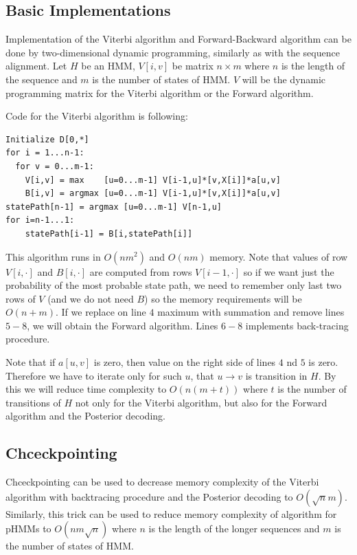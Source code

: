 \subsection{Basic Implementations}

Implementation of the Viterbi algorithm and Forward-Backward algorithm can be
done by two-dimensional dynamic programming, similarly as with the sequence
alignment. Let $H$ be an HMM, $V[i,v]$ be matrix $n\times m$ where $n$ is the
length of the sequence and $m$ is the number of states of HMM. $V$ will be the
dynamic programming matrix for the Viterbi algorithm or the Forward algorithm.

Code for the Viterbi algorithm is following:
\begin{lstlisting}
Initialize D[0,*]
for i = 1...n-1:
  for v = 0...m-1:
    V[i,v] = max    [u=0...m-1] V[i-1,u]*[v,X[i]]*a[u,v]
    B[i,v] = argmax [u=0...m-1] V[i-1,u]*[v,X[i]]*a[u,v]
statePath[n-1] = argmax [u=0...m-1] V[n-1,u]
for i=n-1...1:
    statePath[i-1] = B[i,statePath[i]]
\end{lstlisting}

This algorithm runs in $O(nm^2)$ and $O(nm)$ memory. Note that values of row
$V[i,\cdot]$ and $B[i,\cdot]$ are computed from rows $V[i-1,\cdot]$ so if we
want just the probability of the most probable state path, we need to remember
only last two rows of $V$ (and we do not need $B$) so the memory requirements
will be $O(n+m)$. If we replace on line $4$ maximum with summation and remove
lines $5-8$, we will
obtain the Forward algorithm. Lines $6-8$ implements back-tracing procedure.

Note that if $a[u,v]$ is zero, then value on the right side of lines $4$ nd $5$
is zero. Therefore we have to iterate only for such $u$, that $u\to v$ is
transition in $H$. By this we will reduce time complexity to $O(n(m+t))$ where
$t$ is the number of transitions of $H$ not only for the Viterbi algorithm, but
also for the Forward algorithm and the Posterior decoding.


\subsection{Chceckpointing}

Chceckpointing can be used to decrease memory complexity of the Viterbi
algorithm with backtracing procedure and the Posterior decoding to $O(\sqrt n
m)$.  Similarly, this trick can be used to reduce memory complexity of algorithm
for pHMMs to $O(nm\sqrt n )$ where $n$ is the length of the longer sequences and
$m$ is the number of states of HMM.

